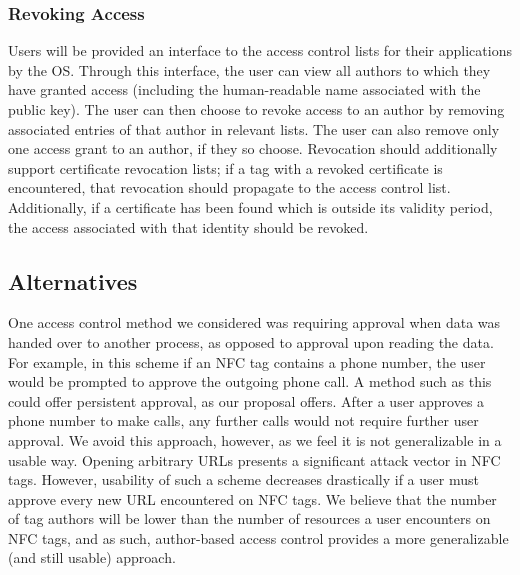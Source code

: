 \documentclass[12pt]{article}
\begin{document}
\subsubsection{Revoking Access}
Users will be provided an interface to the access control lists for their applications by the OS.
Through this interface, the user can view all authors to which they have granted access (including the human-readable name associated with the public key).
The user can then choose to revoke access to an author by removing associated entries of that author in relevant lists.
The user can also remove only one access grant to an author, if they so choose.
Revocation should additionally support certificate revocation lists; if a tag with a revoked certificate is encountered, that revocation should propagate to the access control list.
Additionally, if a certificate has been found which is outside its validity period, the access associated with that identity should be revoked.


\subsection{Alternatives}
One access control method we considered was requiring approval when data was handed over to another process, as opposed to approval upon reading the data.
For example, in this scheme if an NFC tag contains a phone number, the user would be prompted to approve the outgoing phone call.
A method such as this could offer persistent approval, as our proposal offers.
After a user approves a phone number to make calls, any further calls would not require further user approval.
We avoid this approach, however, as we feel it is not generalizable in a usable way.
Opening arbitrary URLs presents a significant attack vector in NFC tags.
However, usability of such a scheme decreases drastically if a user must approve every new URL encountered on NFC tags.
We believe that the number of tag authors will be lower than the number of resources a user encounters on NFC tags, and as such, author-based access control provides a more generalizable (and still usable) approach.
\end{document}
